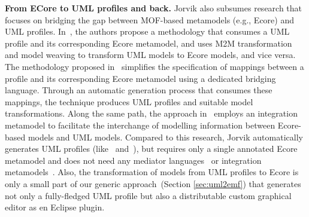 \textbf{From ECore to UML profiles and back.}
Jorvik also subsumes research that focuses on bridging the gap between 
MOF-based metamodels (e.g., Ecore) and UML profiles.
In~\cite{abouzahra2005practical}, the authors propose a methodology 
that consumes a UML profile and its corresponding Ecore metamodel, and uses
M2M transformation and model weaving to transform UML models to 
Ecore models, and vice versa. The methodology proposed 
in~\cite{Wimmer2009:IJWIS} simplifies the specification of mappings 
between a profile and its corresponding Ecore metamodel using a dedicated 
bridging language. Through an automatic generation process that consumes
these mappings, the technique produces UML profiles and suitable model 
transformations. 
Along the same path, the approach in~\cite{Giachetti2009:ICRCIS} employs an 
integration metamodel to facilitate the interchange of modelling information 
between Ecore-based models and UML models. Compared to this research, Jorvik automatically generates UML 
profiles (like~\cite{Wimmer2009:IJWIS} 
and~\cite{Giachetti2009:ICRCIS}), but requires only a single annotated Ecore 
metamodel and does not need any mediator 
languages~\cite{Wimmer2009:IJWIS} 
or integration metamodels~\cite{Giachetti2009:ICRCIS}. Also, the transformation 
of models from UML profiles to Ecore is only a small part of our generic 
approach~(Section \ref{sec:uml2emf}) that generates not only a fully-fledged 
UML profile but also a distributable custom graphical editor as en Eclipse plugin. 

 




